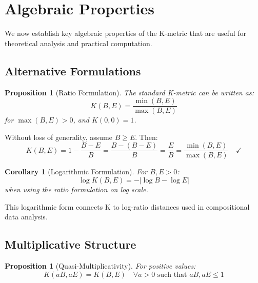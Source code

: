 \documentclass[11pt,a4paper]{article}
\newtheorem{proposition}[theorem]{Proposition}
\newtheorem{corollary}[theorem]{Corollary}
\theoremstyle{remark}
\begin{document}

\section{Algebraic Properties}
\label{sec:properties}

We now establish key algebraic properties of the K-metric that are useful for theoretical analysis and practical computation.

\subsection{Alternative Formulations}

\begin{proposition}[Ratio Formulation]
\label{prop:ratio}
The standard K-metric can be written as:
\begin{equation}
K(B, E) = \frac{\min(B, E)}{\max(B, E)}
\end{equation}
for $\max(B, E) > 0$, and $K(0, 0) = 1$.
\end{proposition}

\begin{proofbox}
Without loss of generality, assume $B \geq E$. Then:
\begin{equation}
K(B, E) = 1 - \frac{B - E}{B} = \frac{B - (B - E)}{B} = \frac{E}{B} = \frac{\min(B, E)}{\max(B, E)} \quad \checkmark
\end{equation}
\end{proofbox}

\begin{corollary}[Logarithmic Formulation]
\label{cor:log}
For $B, E > 0$:
\begin{equation}
\log K(B, E) = -|\log B - \log E|
\end{equation}
when using the ratio formulation on log scale.
\end{corollary}

This logarithmic form connects K to log-ratio distances used in compositional data analysis.

\subsection{Multiplicative Structure}

\begin{proposition}[Quasi-Multiplicativity]
\label{prop:mult}
For positive values:
\begin{equation}
K(aB, aE) = K(B, E) \quad \forall a > 0 \text{ such that } aB, aE \leq 1
\end{equation}
\end{proposition}
\end{document}
